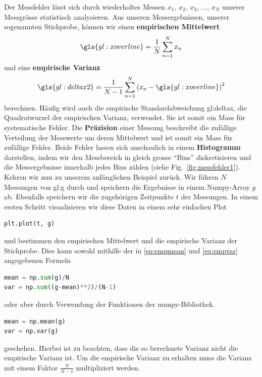 Der Messfehler lässt sich durch wiederholtes Messen $x_1$, $x_2$, $x_3$, ..., $x_N$  unserer Messgrösse statistisch analysieren. Aus unseren Messergebnissen, unserer sogenannten Stichprobe, können wir einen  \textbf{empirischen Mittelwert}
\begin{align}
\gls{gl:xoverline} = \frac{1}{N} \sum^N_{n = 1} x_n
\label{eq:empmean}
\end{align}
und eine \textbf{empirische Varianz}
\begin{align}
\gls{gl:deltax2}  = \frac{1}{N-1} \sum^N_{n = 1} \left( x_n - \gls{gl:xoverline} \right) ^2
\label{eq:empvar}
\end{align}
berechnen. Häufig wird auch die empirische Standardabweichung \gls{gl:deltax}, die Quadratwurzel der empirischen Varianz, verwendet. Sie ist somit ein Mass für systematische Fehler. Die \textbf{Präzision} einer Messung beschreibt die zufällige Verteilung der Messwerte um deren Mittelwert und ist somit ein Mass für zufällige Fehler. Beide Fehler lassen sich anschaulich in einem \textbf{Histogramm} darstellen, indem wir den Messbereich in gleich grosse ``Bins'' diskretisieren und die Messergebnisse innerhalb jedes Bins zählen (siehe Fig.~\ref{fig:messfehler1}).   \\

Kehren wir nun zu unserem anfänglichen Beispiel zurück. Wir führen $N$ Messungen von \gls{gl:g} durch und speichern die Ergebnisse in einem Numpy-Array $g$ ab. Ebenfalls speichern wir die zugehörigen Zeitpunkte $t$ der Messungen. In einem ersten Schritt visualisieren wir diese Daten in einem sehr einfachen Plot
\begin{lstlisting}[language = Python]
plt.plot(t, g)
\end{lstlisting}
und bestimmen den empirischen Mittelwert und die empirische Varianz der Stichprobe. Dies kann sowohl mithilfe der in \ref{eq:empmean} und \ref{eq:empvar} angegebenen Formeln   
\begin{lstlisting}[language = Python]
mean = np.sum(g)/N
var = np.sum((g-mean)**2)/(N-1)
\end{lstlisting}
oder aber durch Verwendung der Funktionen der numpy-Bibliothek. 
\begin{lstlisting}[language = Python]
mean = np.mean(g)
var = np.var(g)
\end{lstlisting}
geschehen. Hierbei ist zu beachten, dass die so berechnete Varianz nicht die empirische Varianz ist. Um die empirische Varianz zu erhalten muss die Varianz mit einem Faktor $\frac{N}{N-1}$ multipliziert werden.\\

